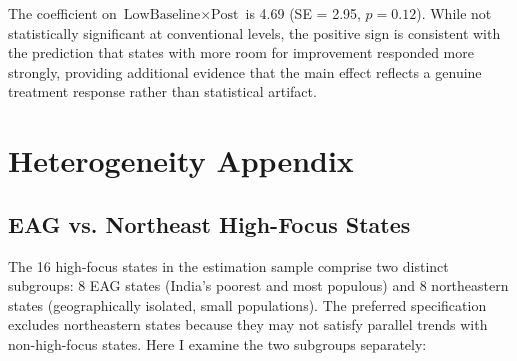 \documentclass[12pt]{article}
\begin{document}
The coefficient on $\text{LowBaseline} \times \text{Post}$ is 4.69 (SE = 2.95, $p = 0.12$). While not statistically significant at conventional levels, the positive sign is consistent with the prediction that states with more room for improvement responded more strongly, providing additional evidence that the main effect reflects a genuine treatment response rather than statistical artifact.


\section{Heterogeneity Appendix}
\label{sec:app_hetero}

\subsection{EAG vs. Northeast High-Focus States}

The 16 high-focus states in the estimation sample comprise two distinct subgroups: 8 EAG states (India's poorest and most populous) and 8 northeastern states (geographically isolated, small populations). The preferred specification excludes northeastern states because they may not satisfy parallel trends with non-high-focus states. Here I examine the two subgroups separately:
\end{document}
